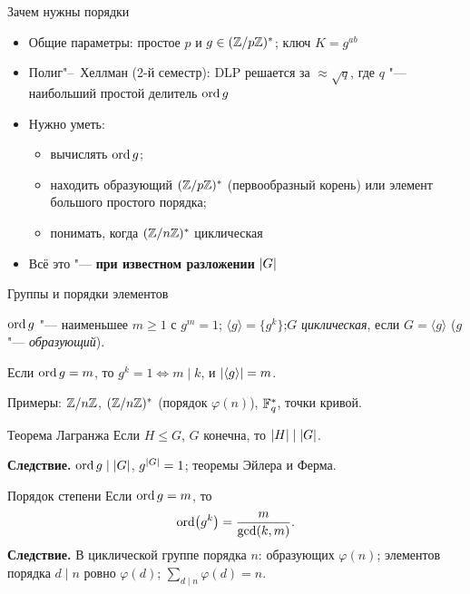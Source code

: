\documentclass{ca-slides}
\author{}
\begin{document}
\titleframe

\begin{canvasframe}{Зачем нужны порядки}
  \small
  \begin{itemize}
    \item Общие параметры: простое $p$ и $g \in (\mathbb{Z}/p\mathbb{Z})^{*}$; ключ $K = g^{ab}$
    \item Полиг"--~Хеллман (2-й семестр): DLP решается за $\approx \sqrt{q}$, где $q$ "---
      наибольший простой делитель $\operatorname{ord} g$
    \item Нужно уметь:
    \begin{itemize}
      \item вычислять $\operatorname{ord} g$;
      \item находить образующий $(\mathbb{Z}/p\mathbb{Z})^{*}$ (первообразный корень) или элемент большого
        простого порядка;
      \item понимать, когда $(\mathbb{Z}/n\mathbb{Z})^{*}$ циклическая
    \end{itemize}
    \item Всё это "--- \textbf{при известном разложении} $\lvert G\rvert$
  \end{itemize}
\end{canvasframe}

\begin{canvasframe}{Группы и порядки элементов}
  \small
  \begin{definition}
    $\operatorname{ord} g$ "--- наименьшее $m \ge 1$ с $g^m = 1$;\quad
    $\langle g \rangle = \{g^k\}$;\quad $G$ \emph{циклическая}, если $G = \langle g \rangle$
    ($g$ "--- \emph{образующий}).
  \end{definition}
  \begin{proposition}
    Если $\operatorname{ord} g = m$, то $g^k = 1 \iff m \mid k$, и $\lvert\langle g \rangle\rvert = m$.
  \end{proposition}
  Примеры: $\mathbb{Z}/n\mathbb{Z}$, $(\mathbb{Z}/n\mathbb{Z})^{*}$ (порядок $\varphi(n)$), $\mathbb{F}_{q}^*$, точки кривой.
\end{canvasframe}

\begin{theoremframe}[theorem]{Теорема Лагранжа}
  Если $H \le G$, $G$ конечна, то $\lvert H\rvert \mid \lvert G\rvert$.

  \smallskip
  \textbf{Следствие.} $\operatorname{ord} g \mid \lvert G\rvert$, $g^{\lvert G\rvert} = 1$; теоремы Эйлера и Ферма.
\end{theoremframe}

\begin{theoremframe}[theorem]{Порядок степени}
  Если $\operatorname{ord} g = m$, то \[\operatorname{ord}\bigl(g^k\bigr) = \frac{m}{\gcd(k, m)}.\]
  \textbf{Следствие.} В циклической группе порядка $n$: образующих $\varphi(n)$; элементов
  порядка $d \mid n$ ровно $\varphi(d)$; $\sum_{d \mid n} \varphi(d) = n$.
\end{theoremframe}
\end{document}
